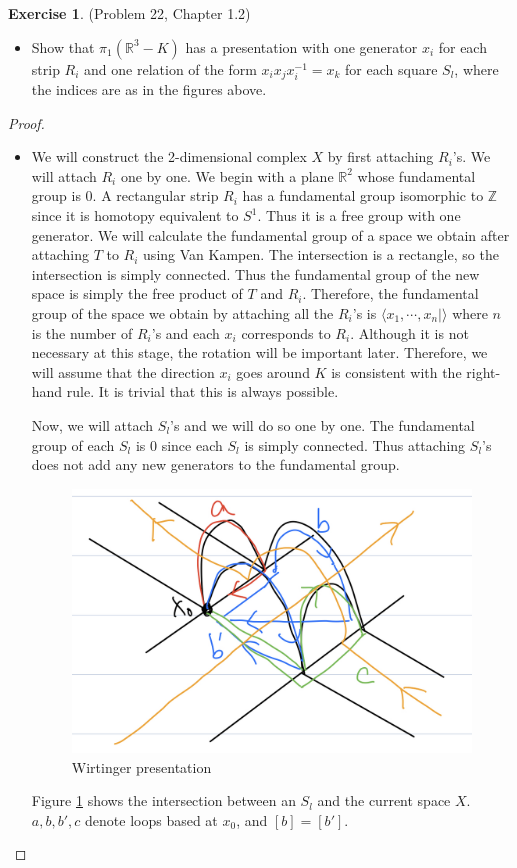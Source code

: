 \documentclass[12pt, psamsfonts]{amsart}
\theoremstyle{definition}
\newtheorem*{exer}{Exercise}
\theoremstyle{remark}
\numberwithin{equation}{section}
\begin{document}
\begin{exer}{(Problem 22, Chapter 1.2)}
  $ $
  \begin{itemize}
    \item
      Show that $\pi_1(\mathbb{R}^3 - K)$ has a presentation with one generator $x_i$ for each strip $R_i$ and one relation of the form $x_ix_jx_i^{-1} = x_k$ for each square $S_l$,
      where the indices are as in the figures above.
  \end{itemize}
\end{exer}

\begin{proof}
  $ $
  \begin{itemize}
    \item
      We will construct the 2-dimensional complex $X$ by first attaching $R_i$'s.
      We will attach $R_i$ one by one.
      We begin with a plane $\mathbb{R}^2$ whose fundamental group is $0$.
      A rectangular strip $R_i$ has a fundamental group isomorphic to $\mathbb{Z}$ since it is homotopy equivalent to $S^1$.
      Thus it is a free group with one generator.
      We will calculate the fundamental group of a space we obtain after attaching $T$ to $R_i$ using Van Kampen.
      The intersection is a rectangle, so the intersection is simply connected.
      Thus the fundamental group of the new space is simply the free product of $T$ and $R_i$.
      Therefore, the fundamental group of the space we obtain by attaching all the $R_i$'s is $\langle x_1, \cdots, x_n \mid \rangle$ where $n$ is the number of $R_i$'s and each $x_i$ corresponds to $R_i$.
      Although it is not necessary at this stage, the rotation will be important later.
      Therefore, we will assume that the direction $x_i$ goes around $K$ is consistent with the right-hand rule.
      It is trivial that this is always possible.

      Now, we will attach $S_l$'s and we will do so one by one.
      The fundamental group of each $S_l$ is $0$ since each $S_l$ is simply connected.
      Thus attaching $S_l$'s does not add any new generators to the fundamental group.
      \begin{figure}
        \includegraphics[width=.5\linewidth]{wirtinger.jpeg}
        \caption{Wirtinger presentation}
        \label{fig:wirtinger}
      \end{figure}
      Figure \ref{fig:wirtinger} shows the intersection between an $S_l$ and the current space $X$.
      $a, b, b', c$ denote loops based at $x_0$, and $[b] = [b']$.


\end{itemize}
\end{proof}
\end{document}
